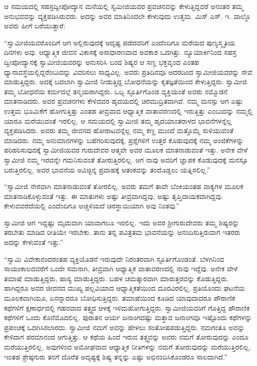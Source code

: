  ಆ ಸಮಯದಲ್ಲಿ ಸಹಸ್ರದ್ವೀಪೋದ್ಯಾನ ಮನೆಯಲ್ಲಿ ಸ್ವಮೀಜಿಯವರ ಪ್ರವಚನವನ್ನು ಕೇಳುತ್ತಿದ್ದವರೆ ಅನಂತರ ತಮ್ಮ ಅನುಭವವನ್ನು ವ್ಯಕ್ತಪಡಿಸಿರುವರು. ಅದನ್ನು ಅವರ ಮಾತಿನಿಂದಲೇ ಕೇಳುವುದು ಉತ್ತಮ. ಮಿಸ್ ಎಸ್. ಇ. ವಾಲ್ಡೊ ಅವರು ಹೀಗೆ ಬರೆಯುತ್ತಾರೆ: 

 “ಸ್ವಾಮೀಜಿಯವರೊಂದಿಗೆ ಆಗ ಅಲ್ಲಿರುವುದಕ್ಕೆ ಅದೃಷ್ಟ ಪಡೆದವರಿಗೆ ಎಂದೆಂದಿಗೂ ಮರೆಯದ ಪುಣ್ಯಸ್ಮೃತಿಯ ದಿನಗಳು ಅವು. ಆಧ್ಯಾತ್ಮಿಕ ಜೀವನ ವಿಕಾಸಕ್ಕೆ ಅಸಾಧಾರಣವಾದ ಅವಕಾಶ ಒದಗಿತ್ತು. ನ್ಯೂಯಾರ್ಕಿನಿಂದ ಸಹಸ್ರ ದ್ವೀಪೋದ್ಯಾನಕ್ಕೆ ಸ್ವಾಮೀಜಿಯವರನ್ನು ಅನುಸರಿಸಿ ಬಂದ ಶಿಷ್ಯರ ಆ ಸಣ್ಣ ಭಕ್ತವೃಂದ ಎಂತಹ ಧ್ಯಾನಾವಸ್ಥೆಯಲ್ಲಿದ್ದರೆಂಬುದನ್ನು ವಿವರಿಸಲು ಸಾಧ್ಯವಿಲ್ಲ. ಅವರು ಪ್ರತಿದಿನವೂ ಆದರದಿಂದ ಸ್ವಾಮೀಜಿಯವರನ್ನು ಸೇವೆ ಮಾಡುತ್ತಿದ್ದರು. ಅದಕ್ಕೆ ಬದಲಾಗಿ ಸ್ವಾಮೀಜಿ ನೀಡುತ್ತಿದ್ದ ಬೋಧನೆಯನ್ನು ಕೃತಜ್ಞತೆಯಿಂದ ಕೇಳುತ್ತಿದ್ದರು. ಸ್ವಾಮೀಜಿ ತಮ್ಮ ಬೋಧನೆಯ ಕರ್ಮದಲ್ಲೆ ತನ್ಮಯರಾಗಿದ್ದರು. ಒಬ್ಬ ಸ್ಫೂರ್ತಿಗೊಂಡ ವ್ಯಕ್ತಿಯಂತೆ ಅವರು ನಮ್ಮೊಡನೆ ಮಾತನಾಡಿದರು. ಅವರ ಪ್ರವಚನಗಳು ಕೇಳಿದವರ ಹೃದಯದಲ್ಲಿ ಚಿರಮುದ್ರಿತವಾಗಿವೆ. ನಮ್ಮ ಮನಸ್ಸು ಆಗ ಎಷ್ಟು ಉತ್ತಮ ಭೂಮಿಕೆಗೆ ಹೋಗುತ್ತಿತ್ತು ಎಂತಹ ತೀವ್ರವಾದ ಆಧ್ಯಾತ್ಮಿಕ ವಾತಾವರಣದಲ್ಲಿ ಇರುತ್ತಿತ್ತು ಎಂಬುದನ್ನು ನಮ್ಮಲ್ಲಿ ಯಾರೂ ಮರೆಯುವಂತೆ ಇರಲಿಲ್ಲ. ಆ ಸಮಯದಲ್ಲಿ ಸ್ವಾಮೀಜಿ ತಮ್ಮ ಹೃದಯಾಂತರಾಳದ ಭಾವನೆಗಳನ್ನೆಲ್ಲ ವ್ಯಕ್ತಪಡಿಸಿದರು. ಅವರು ತಮ್ಮ ಜೀವನದ ಹೋರಾಟವನ್ನೆಲ್ಲ ನಮ್ಮ ಕಣ್ಣ ಮುಂದೆ ಮತ್ತೊಮ್ಮೆ ಸುಳಿಯುವಂತೆ ಮಾಡಿದರು. ನಮ್ಮ ಅನುಮಾನಗಳನ್ನು ಬಹೆಗರಿಸುವುದಕ್ಕೆ, ಪ್ರಶ್ನೆಗಳಿಗೆ ಉತ್ತರ ಕೊಡುವುದಕ್ಕೆ ನಮ್ಮ ಅಂಜಿಕೆಗಳನ್ನು ಪರಿಹರಿಸುವುದಕ್ಕೆ ಸ್ವಾಮೀಜಿಯವರ ಗುರುದೇವರ ಆತ್ಮವೇ ಅವರ ಮೂಲಕ ಮಾತನಾಡುವಂತೆ ಇತ್ತು. ಅನೇಕ ವೇಳೆ ಸ್ವಾಮೀಜಿ ನಮ್ಮ ಇರವನ್ನೇ ಗಮನಿಸುವಂತೆ ತೋರುತ್ತಿರಲಿಲ್ಲ. ಆಗ ನಾವು ಅವರಿಗೆ ಜ್ಞಾಪಕ ಕೊಡುವುದಕ್ಕೆ ಮನಸ್ಸೂ ಬರುತ್ತಿರಲಿಲ್ಲ. ಅವರ ಭಾವನೆಯ ಅವಿಚ್ಛಿನ್ನ ಪ್ರವಾಹಕ್ಕೆ ಆತಂಕವನ್ನು ತಂದೊಡ್ಡಲು ಯತ್ನಿಸಲಿಲ್ಲ.” 

 “ಸ್ವಾಮೀಜಿ ನೇರವಾಗಿ ಮಾತನಾಡುವಂತೆ ತೋರಲಿಲ್ಲ. ಅವರು ತಮಗೆ ತಾವೇ ಬೆಂಕಿಯಂತಹ ವಾಕ್ಯಗಳ ಮೂಲಕ ಮಾತನಾಡಿಕೊಳ್ಳುವಂತೆ ಇತ್ತು. ಈ ಮಾತುಗಳು ಅಷ್ಟು ತೀವ್ರವಾಗಿದ್ದವು, ಅಷ್ಟು ತೃಪ್ತಿದಾಯಕವಾಗಿದ್ದವು. ಕೇಳುವವರೆದೆಯಲ್ಲಿ ಎಂದೆಂದಿಗೂ ಅಚ್ಚಳಿಯದೆ ಚಿರಸ್ಥಾಯಿಯಾಗಿ ಅವು ನಿಂತವು.” 

 ಸ್ವಾಮೀಜಿ ಆಗ ಇದ್ದಷ್ಟು ಮೃದುವಾಗಿ ಯಾವಾಗಲೂ ಇರಲಿಲ್ಲ. ಇದು ಅವರ ಶ‍್ರೀಗುರುದೇವರು ತಮ್ಮ ಶಿಷ್ಯರನ್ನು ತರಬೇತು ಮಾಡಿದ ರೀತಿಯೇ ಇರಬೇಕು. ತಾನು ತನ್ನ ಪವಿತ್ರತಮ ಭಾವನೆಯನ್ನು ಆನಂದಿಸುತ್ತಿರುವಾಗ ಇತರರು ಅದನ್ನು ಕೇಳುವಂತೆ ಇತ್ತು.” 

 “ಸ್ವಾಮಿ ವಿವೇಕಾನಂದರಂತಹ ವ್ಯಕ್ತಿಯೊಡನೆ ಇರುವುದೇ ನಿರಂತರವಾಗಿ ಸ್ಫೂರ್ತಿಗೊಂಡಂತೆ. ಬೆಳಗಿನಿಂದ ಸಾಯಂಕಾಲದವರೆಗೆ ಒಂದೇ ಸಮನಾಗಿ, ತೀವ್ರವಾಗಿ ಆಧ್ಯಾತ್ಮಿಕ ವಾತಾವರಣದಲ್ಲಿ ನಾವು ಇದ್ದೆವು. ಅನೇಕ ವೇಳೆ ತಮಾಷೆ ಮಾಡುತ್ತಿದ್ದರು, ಹಾಸ್ಯ ಮಾಡುತ್ತಿದ್ದರು. ಬಹಳ ಚಮತ್ಕಾರವಾಗಿ ಮಾರುತ್ತರವನ್ನು ಕೊಡುತ್ತಿದ್ದರು. ಹಾಗಿದ್ದರೂ ಅವರ ಜೀವನದ ಮುಖ್ಯ ಪಲ್ಲವಿಯಾದ ಆಧ್ಯಾತ್ಮಿಕತೆಯಿಂದ ದೂರವಿರಲಿಲ್ಲ. ಪ್ರತಿಯೊಂದು ಘಟನೆಯ ಮೂಲಕವಾಗಿಯೂ, ಏನನ್ನಾದರೂ ಬೋಧಿಸುತ್ತಿದ್ದರು. ತಮಾಷೆಯಿಂದ ಕೂಡಿದ ಯಾವುದಾದರೂ ಪೌರಾಣಿಕ ಕಥೆಗಳಿಗೆ ಕ್ಷಣಾರ್ಧದಲ್ಲಿ ಗಹನವಾದ ತತ್ತ್ವದ ಆಳಕ್ಕೆ ಇಳಿದುಹೋಗುತ್ತಿದ್ದರು. ಸ್ವಾಮೀಜಿಯವರಿಗೆ ಗೊತ್ತಿದ್ದ ಪೌರಾಣಿಕ ಕಥೆಗಳಿಗೆ ಒಂದು ಕೊನೆಮೊದಲಿಲ್ಲ. ಪುರಾತನ ಆರ್ಯ ಜನಾಂಗದಷ್ಟು ಮತ್ತಾವ ಜನಾಂಗವೂ ಇಷ್ಟೊಂದು ಕಥೆಗಳನ್ನು ಪ್ರಪಂಚಕ್ಕೆ ಒದಗಿಸಿರಲಾರದು. ಸ್ವಾಮೀಜಿ ನಮಗೆ ಅವನ್ನು ಹೇಳಲು ಸಂತೋಷಪಡುತ್ತಿದ್ದರು. ನಮಗಂತೂ ಅವನ್ನು ಕೇಳಿದಾಗ ಪರಮಾನಂದ ಆಗುತ್ತಿತ್ತು. ಆ ಕಥೆಯ ಹಿಂದೆ ಇರುವ ತತ್ತ್ವವನ್ನು ಅವರು ನಮಗೆ ತೋರುವುದನ್ನು ಎಂದೂ ಮರೆಯುತ್ತಿರಲಿಲ್ಲ. ಅವುಗಳಿಂದ ಅಮೋಘವಾದ ಆಧ್ಯಾತ್ಮಿಕ ನೀತಿಗಳನ್ನು ನಮಗೆ ತೋರುವುದನ್ನು ಮರೆಯುತ್ತಿರಲಿಲ್ಲ. ಇಂತಹ ಶ್ರೇಷ್ಠಗುರು ತನಗೆ ದೊರೆತ ಅದೃಷ್ಟಕ್ಕೆ ಶಿಷ್ಯ ತನ್ನನ್ನು ಎಷ್ಟು ಅಭಿನಂದಿಸಿಕೊಂಡರೂ ಸಾಲದಾಗಿದೆ.” 

